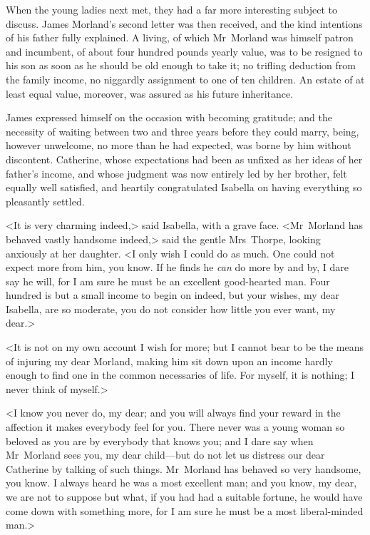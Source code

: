  When the young ladies next met, they had a far more interesting subject to discuss. James Morland's second letter was then received, and the kind intentions of his father fully explained. A living, of which Mr~Morland was himself patron and incumbent, of about four hundred pounds yearly value, was to be resigned to his son as soon as he should be old enough to take it; no trifling deduction from the family income, no niggardly assignment to one of ten children. An estate of at least equal value, moreover, was assured as his future inheritance. 

 James expressed himself on the occasion with becoming gratitude; and the necessity of waiting between two and three years before they could marry, being, however unwelcome, no more than he had expected, was borne by him without discontent. Catherine, whose expectations had been as unfixed as her ideas of her father's income, and whose judgment was now entirely led by her brother, felt equally well satisfied, and heartily congratulated Isabella on having everything so pleasantly settled. 

 <It is very charming indeed,> said Isabella, with a grave face. <Mr~Morland has behaved vastly handsome indeed,> said the gentle Mrs~Thorpe, looking anxiously at her daughter. <I only wish I could do as much. One could not expect more from him, you know. If he finds he \textit{can} do more by and by, I dare say he will, for I am sure he must be an excellent good-hearted man. Four hundred is but a small income to begin on indeed, but your wishes, my dear Isabella, are so moderate, you do not consider how little you ever want, my dear.> 

 <It is not on my own account I wish for more; but I cannot bear to be the means of injuring my dear Morland, making him sit down upon an income hardly enough to find one in the common necessaries of life. For myself, it is nothing; I never think of myself.> 

 <I know you never do, my dear; and you will always find your reward in the affection it makes everybody feel for you. There never was a young woman so beloved as you are by everybody that knows you; and I dare say when Mr~Morland sees you, my dear child—but do not let us distress our dear Catherine by talking of such things. Mr~Morland has behaved so very handsome, you know. I always heard he was a most excellent man; and you know, my dear, we are not to suppose but what, if you had had a suitable fortune, he would have come down with something more, for I am sure he must be a most liberal-minded man.> 

